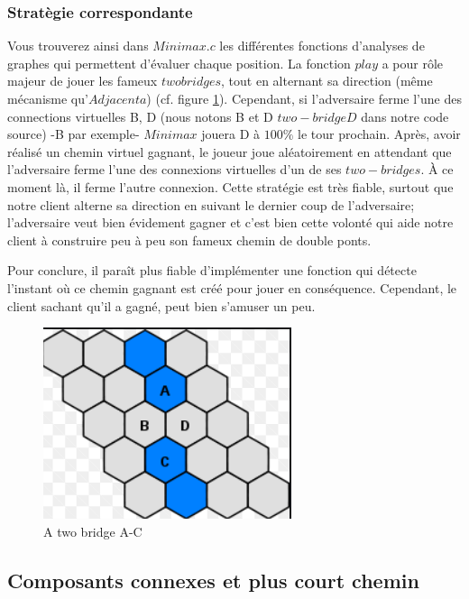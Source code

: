 \documentclass{article}
\begin{document}
\subsubsection{Stratègie correspondante}
Vous trouverez ainsi dans $Minimax.c$ les différentes fonctions d'analyses de graphes qui permettent d'évaluer chaque position. La fonction $play$ a pour rôle majeur de jouer les fameux $two bridges$, tout en alternant sa direction (même mécanisme qu'$Adjacenta$) (cf. figure \ref{fig:2bridge}). Cependant, si l'adversaire ferme l'une des connections virtuelles B, D (nous notons B et D $two-bridgeD$ dans notre code source) -B par exemple-  $Minimax$ jouera D à $100\%$ le tour prochain. Après, avoir réalisé un chemin virtuel gagnant, le joueur joue aléatoirement en attendant que l'adversaire ferme l'une des connexions  virtuelles d'un de ses $two-bridges$. \`A ce moment là, il ferme l'autre connexion. Cette stratégie est très fiable, surtout que notre client alterne sa direction en suivant le dernier coup de l'adversaire; l'adversaire veut bien évidement gagner et c'est bien cette volonté qui aide notre client à construire peu à peu son fameux chemin de double ponts. 

Pour conclure, il paraît plus fiable d'implémenter une fonction qui détecte l'instant o\`u ce chemin gagnant est créé pour jouer en conséquence. Cependant, le client sachant qu'il a gagné, peut bien s'amuser un peu. 
\begin{figure}[ht]
    \centering
    \includegraphics[scale=1]{2bridge.png}
    \caption{A two bridge A-C}
    \label{fig:2bridge}
\end{figure}

\subsection{Composants connexes et plus court chemin}
\end{document}
